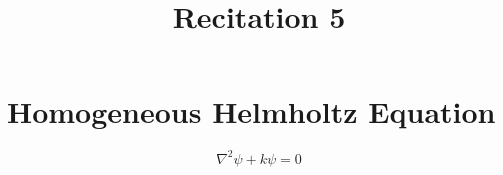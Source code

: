 \documentclass[fleqn]{article}
\title{Recitation 5}
\author{}
\date{\formatdate{26}{11}{2014}}
\begin{document}
\maketitle

\tableofcontents

\newpage
\section{Homogeneous Helmholtz Equation}

\begin{equation*}
	\nabla^2 \psi + k \psi = 0
\end{equation*}
\end{document}
